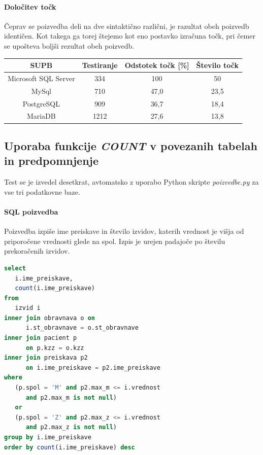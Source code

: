 \documentclass[a4paper,11pt]{report}
\begin{document}
\paragraph{Določitev točk} Čeprav se poizvedba deli na dve sintaktično različni, je razultat obeh poizvedb identičen. Kot takega
ga torej štejemo kot eno postavko izračuna točk, pri čemer se upošteva boljši rezultat obeh poizvedb.

\begin{center}
   \begin{tabular}{||c|c|c|c||}
      \hline
      \textbf{SUPB} & \textbf{Testiranje} & \textbf{Odstotek točk [\%]} & \textbf{Število točk}\\
      \hline
      \hline
      Microsoft SQL Server & 334 & 100 & 50 \\
      MySql & 710 & 47,0 & 23,5 \\
      PostgreSQL & 909 & 36,7 & 18,4\\
      MariaDB & 1212 & 27,6 & 13,8 \\
      \hline
   \end{tabular}
\end{center}

\subsection{Uporaba funkcije \textit{COUNT} v povezanih tabelah in predpomnjenje}
Test se je izvedel desetkrat, avtomatsko z uporabo Python skripte \textit{poizvedbe.py} za vse tri podatkovne baze.

\paragraph{SQL poizvedba}
Poizvedba izpiše ime preiskave in število izvidov, katerih vrednost je višja od priporočene vrednosti glede na spol.
Izpis je urejen padajoče po številu prekoračenih izvidov.
\pagebreak
\begin{lstlisting}[language = SQL]
select
   i.ime_preiskave,
   count(i.ime_preiskave)
from
   izvid i
inner join obravnava o on 
      i.st_obravnave = o.st_obravnave
inner join pacient p 
      on p.kzz = o.kzz
inner join preiskava p2 
      on i.ime_preiskave = p2.ime_preiskave
where
   (p.spol = 'M' and p2.max_m <= i.vrednost 
      and p2.max_m is not null) 
   or
   (p.spol = 'Z' and p2.max_z <= i.vrednost 
      and p2.max_z is not null)
group by i.ime_preiskave
order by count(i.ime_preiskave) desc
\end{lstlisting}
\end{document}

